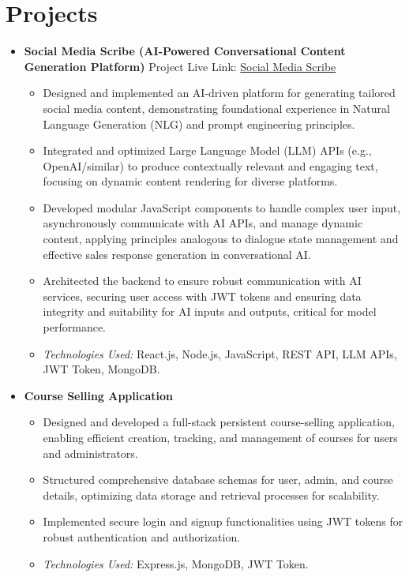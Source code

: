 \documentclass[11pt]{article}
\begin{document}
\section*{Projects}
\vspace{-5pt} %
\begin{itemize}[leftmargin=*,labelsep=0.5em]
    \item \textbf{Social Media Scribe (AI-Powered Conversational Content Generation Platform)} \hfill Project Live Link: \underline{Social Media Scribe}
    \begin{itemize}[leftmargin=1.5em]
        \item Designed and implemented an AI-driven platform for generating tailored social media content, demonstrating foundational experience in Natural Language Generation (NLG) and prompt engineering principles.
        \item Integrated and optimized Large Language Model (LLM) APIs (e.g., OpenAI/similar) to produce contextually relevant and engaging text, focusing on dynamic content rendering for diverse platforms.
        \item Developed modular JavaScript components to handle complex user input, asynchronously communicate with AI APIs, and manage dynamic content, applying principles analogous to dialogue state management and effective sales response generation in conversational AI.
        \item Architected the backend to ensure robust communication with AI services, securing user access with JWT tokens and ensuring data integrity and suitability for AI inputs and outputs, critical for model performance.
        \item \textit{Technologies Used:} React.js, Node.js, JavaScript, REST API, LLM APIs, JWT Token, MongoDB.
    \end{itemize}

    \item \textbf{Course Selling Application}
    \begin{itemize}[leftmargin=1.5em]
        \item Designed and developed a full-stack persistent course-selling application, enabling efficient creation, tracking, and management of courses for users and administrators.
        \item Structured comprehensive database schemas for user, admin, and course details, optimizing data storage and retrieval processes for scalability.
        \item Implemented secure login and signup functionalities using JWT tokens for robust authentication and authorization.
        \item \textit{Technologies Used:} Express.js, MongoDB, JWT Token.
    \end{itemize}
\end{itemize}
\end{document}
